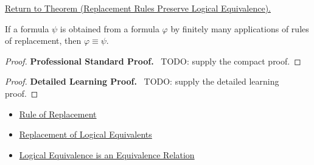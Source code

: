 \newpage
{}
\label{prf:replacement-rules-preserve-logical-equivalence-propositional-logic}

\begin{remark*}[Return]
\hyperref[thm:replacement-rules-preserve-logical-equivalence-propositional-logic]{Return to Theorem (Replacement Rules Preserve Logical Equivalence).}
\end{remark*}

\begin{theorem*}
If a formula \(\psi\) is obtained from a formula \(\varphi\) by finitely many
applications of rules of replacement, then \(\varphi\equiv\psi\).
\end{theorem*}

\begin{proof}
\textbf{Professional Standard Proof.}~
TODO: supply the compact proof.
\end{proof}

\begin{proof}
\textbf{Detailed Learning Proof.}~
TODO: supply the detailed learning proof.
\end{proof}

\begin{remark*}
\end{remark*}

\begin{dependencies}
\begin{itemize}
  \item \hyperref[def:rule-of-replacement-propositional-logic]{Rule of Replacement}
  \item \hyperref[thm:replacement-of-logical-equivalents-propositional-logic]{Replacement of Logical Equivalents}
  \item \hyperref[thm:logical-equivalence-equivalence-relation]{Logical Equivalence is an Equivalence Relation}
\end{itemize}
\end{dependencies}

\clearpage
